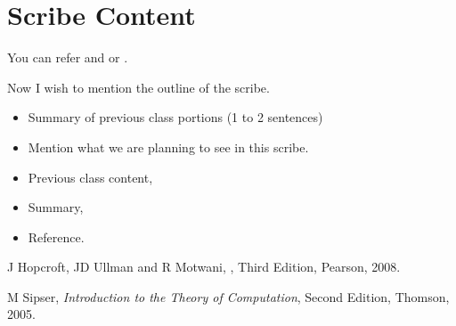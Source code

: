 \documentclass[a4paper,10pt]{article}
\begin{document}
\noindent 
\vspace*{-40 pt}
\begin{center}
\end{center}

\section{Scribe Content}
You can refer \cite{HUM} and \cite{Sip} or \cite{HUM, Sip}. 

Now I wish to mention the outline of the scribe. 
\begin{itemize}
	\item Summary of previous class portions (1 to 2 sentences)
	\item Mention what we are planning to see in this scribe. 
	\item Previous class content, 
	\item Summary,
	\item Reference.
\end{itemize} 


\begin{thebibliography}{10}
J Hopcroft, JD Ullman and R Motwani, , Third Edition, \newblock Pearson, 2008.

M Sipser, {\em Introduction to the Theory of Computation}, Second Edition, \newblock Thomson, 2005.

\end{thebibliography}
\end{document}
